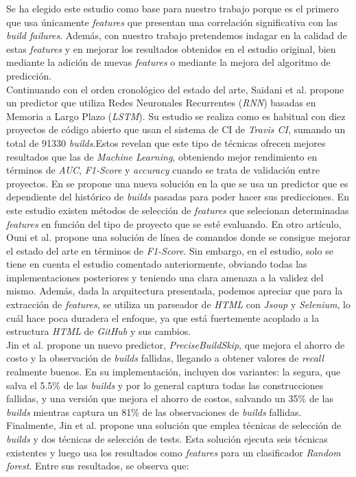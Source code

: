 Se ha elegido este estudio \cite{2} como base para nuestro trabajo porque es el primero que usa
únicamente \textit{features} que presentan una correlación significativa con las \textit{build
failures}. Además, con nuestro trabajo pretendemos indagar en la calidad de estas \textit{features}
y en mejorar los resultados obtenidos en el estudio original, bien mediante la adición de nuevas
\textit{features} o mediante la mejora del algoritmo de predicción.\\

Continuando con el orden cronológico del estado del arte, Saidani et al. \cite{15} propone un
predictor que utiliza Redes Neuronales Recurrentes (\textit{RNN}) basadas en Memoria a Largo
Plazo (\textit{LSTM}). Su estudio se realiza como es habitual con diez proyectos de código
abierto que usan el sistema de CI de \textit{Travis CI}, sumando un total de 91330
\textit{builds}.Estos revelan que este tipo de técnicas ofrecen mejores resultados
que las de \textit{Machine Learning}, obteniendo mejor rendimiento en términos de \textit{AUC},
\textit{F1-Score} y \textit{accuracy} cuando se trata de validación entre proyectos. En \cite{6}
se propone una nueva solución en la que se usa un predictor que es dependiente del histórico de
\textit{builds} pasadas para poder hacer sus predicciones. En este estudio existen métodos de
selección de \textit{features} que selecionan determinadas \textit{features} en función del tipo
de proyecto que se esté evaluando. En otro artículo, Ouni et al. \cite{14} propone una solución
de línea de comandos donde se consigue mejorar el estado del arte en términos de \textit{F1-Score}.
Sin embargo, en el estudio, solo se tiene en cuenta el estudio \cite{7} comentado anteriormente,
obviando todas las implementaciones posteriores y teniendo una clara amenaza a la validez del
mismo. Además, dada la arquitectura presentada, podemos apreciar que para la extracción de
\textit{features}, se utiliza un parseador de \textit{HTML} con \textit{Jsoup} y \textit{Selenium},
lo cuál hace poca duradera el enfoque, ya que está fuertemente acoplado a la estructura
\textit{HTML} de \textit{GitHub} y sus cambios. \\

Jin et al. \cite{4} propone un nuevo predictor, \textit{PreciseBuildSkip}, que mejora el ahorro
de costo y la observación de \textit{builds} fallidas, llegando a obtener valores de
\textit{recall} realmente buenos. En su implementación, incluyen dos variantes: la segura, que
salva el 5.5\% de las \textit{builds} y por lo general captura todas las construcciones fallidas,
y una versión que mejora el ahorro de costos, salvando un 35\% de las \textit{builds} mientras
captura un 81\% de las observaciones de \textit{builds} fallidas. Finalmente, Jin et al. \cite{1} propone
una solución que emplea técnicas de selección de \textit{builds} y dos técnicas de selección de
tests. Esta solución ejecuta seis técnicas existentes y luego usa los resultados como
\textit{features} para un clasificador \textit{Random forest}. Entre sus resultados, se observa
que:

